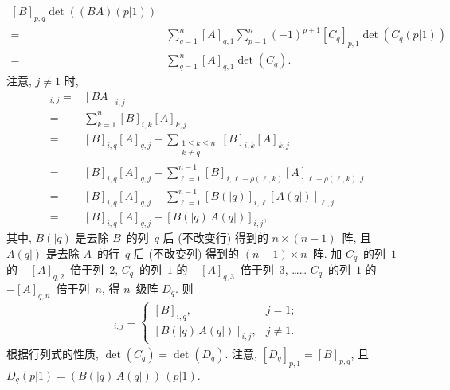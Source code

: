 \documentclass[../libro.tex]{subfiles}
\begin{document}
\begin{example}
\begin{align*}
{{                [B]_{p,q}
                \det {((BA)(p|1))}
            }
        }
        \\
        = {} &
        \sum_{q=1}^{n} {
            [A]_{q,1}
            \sum_{p=1}^{n} {
                (-1)^{p+1}
                [C_q]_{p,1}
                \det {(C_q (p|1))}
            }
        }
        \\
        = {} &
        \sum_{q=1}^{n} {
            [A]_{q,1}
            \det {(C_q)}
        }.
    \end{align*}
    注意, \(j \neq 1\) 时,
    \begin{align*}
        [C_q]_{i,j}
        = {} &
        [BA]_{i,j}
        \\
        = {} &
        \sum_{k=1}^{n} {
            [B]_{i,k} [A]_{k,j}
        }
        \\
        = {} &
        [B]_{i,q} [A]_{q,j} +
        \sum_{\substack{1 \leq k \leq n \\ k \neq q}} {
            [B]_{i,k} [A]_{k,j}
        }
        \\
        = {} &
        [B]_{i,q} [A]_{q,j} +
        \sum_{\ell=1}^{n-1} {
            [B]_{i,\ell+\rho(\ell,k)}
            [A]_{\ell+\rho(\ell,k),j}
        }
        \\
        = {} &
        [B]_{i,q} [A]_{q,j} +
        \sum_{\ell=1}^{n-1} {
            [B({|q})]_{i,\ell}
            [A({q|})]_{\ell,j}
        }
        \\
        = {} &
        [B]_{i,q} [A]_{q,j} +
        [B({|q})\, A({q|})]_{i,j},
    \end{align*}
    其中, \(B({|q})\) 是去除 \(B\)~的列~\(q\) 后 (不改变行)
    得到的 \(n \times (n-1)\)~阵,
    且 \(A({q|})\) 是去除 \(A\)~的行~\(q\) 后 (不改变列)
    得到的 \((n-1) \times n\)~阵.
    加
    \(C_q\)~的列~\(1\) 的 \(-[A]_{q,2}\)~倍于列~\(2\),
    \(C_q\)~的列~\(1\) 的 \(-[A]_{q,3}\)~倍于列~\(3\),
    ……
    \(C_q\)~的列~\(1\) 的 \(-[A]_{q,n}\)~倍于列~\(n\),
    得 \(n\)~级阵 \(D_q\).
    则
    \begin{align*}
        [D_q]_{i,j} =
        \begin{cases}
            [B]_{i,q},                 & j = 1;    \\
            [B({|q})\, A({q|})]_{i,j}, & j \neq 1.
        \end{cases}
    \end{align*}
    根据行列式的性质, \(\det {(C_q)} = \det {(D_q)}\).
    注意, \([D_q]_{p,1} = [B]_{p,q}\),
    且 \(D_q (p|1) = (B({|q})\, A({q|}))\, (p|1)\).

\end{example}
\end{document}

